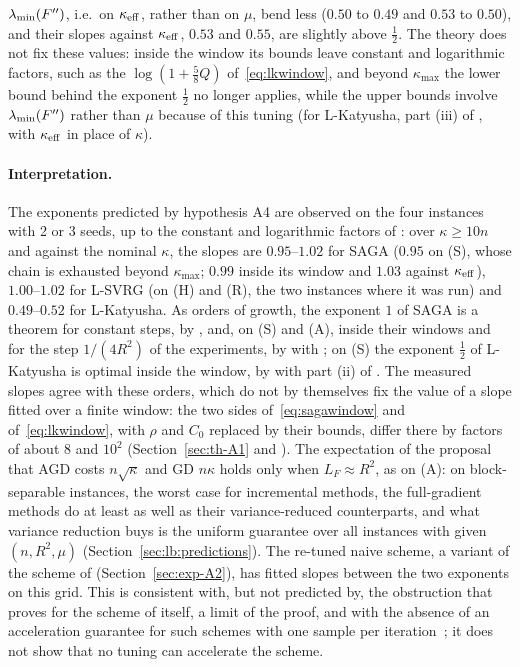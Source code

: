 $\lambda_{\min}(F'')$, i.e.\ on $\kappa_{\rm eff}$, rather than on $\mu$, bend less ($0.50$ to $0.49$ and $0.53$ to $0.50$), and
their slopes against $\kappa_{\rm eff}$, $0.53$ and $0.55$, are slightly above $\frac12$. The theory does not fix these
values: inside the window its bounds leave constant and logarithmic factors, such as the $\log(1+\frac58Q)$
of~\eqref{eq:lkwindow}, and beyond $\kappa_{\max}$ the lower bound behind the exponent $\frac12$ no longer applies, while
the upper bounds involve $\lambda_{\min}(F'')$ rather than $\mu$ because of this tuning (for L-Katyusha, part (iii) of
, with $\kappa_{\rm eff}$ in place of $\kappa$).

\paragraph{Interpretation.}
The exponents predicted by hypothesis A4 are observed on the four instances with 2 or 3 seeds, up to the constant and
logarithmic factors of : over $\kappa\ge10n$ and against the nominal $\kappa$, the slopes are $0.95$--$1.02$
for SAGA ($0.95$ on (S), whose chain is exhausted beyond $\kappa_{\max}$; $0.99$ inside its window and $1.03$ against
$\kappa_{\rm eff}$), $1.00$--$1.02$ for L-SVRG (on (H) and (R), the two instances where it was run) and $0.49$--$0.52$ for
L-Katyusha. As orders of growth, the exponent $1$ of SAGA is a theorem for constant steps, by ,
and, on (S) and (A), inside their windows and for the step $1/(4R^2)$ of the experiments, by  with
; on (S) the exponent $\frac12$ of L-Katyusha is optimal inside the window, by 
with part (ii) of . The measured slopes agree with these orders, which do not by themselves fix the
value of a slope fitted over a finite window: the two sides of~\eqref{eq:sagawindow} and of~\eqref{eq:lkwindow}, with
$\rho$ and $C_0$ replaced by their bounds, differ there by factors of about $8$ and $10^2$ (Section~\ref{sec:th-A1} and
).
The expectation of the proposal that AGD costs $n\sqrt\kappa$ and GD $n\kappa$ holds only when $L_F\approx R^2$, as on
(A): on block-separable instances, the worst case for incremental methods, the full-gradient methods do at least as well
as their variance-reduced counterparts, and what variance reduction buys is the uniform guarantee over all instances with
given $(n,R^2,\mu)$ (Section~\ref{sec:lb:predictions}). The re-tuned naive scheme, a variant of the scheme
of  (Section~\ref{sec:exp-A2}), has fitted slopes between the two exponents on this grid. This is
consistent with, but not predicted by, the obstruction that  proves for the scheme
of  itself, a limit of the proof, and with the absence of an acceleration guarantee for such schemes
with one sample per iteration~\cite{nitanda2014stochastic}; it does not show that no tuning can accelerate the scheme.

